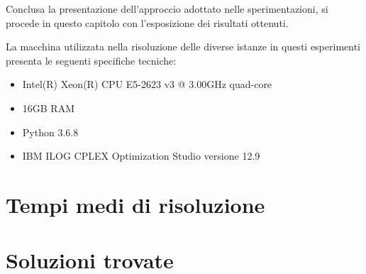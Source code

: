 Conclusa la presentazione dell'approccio adottato nelle sperimentazioni, si procede in questo capitolo con l'esposizione dei risultati ottenuti. 

La macchina utilizzata nella risoluzione delle diverse istanze in questi esperimenti presenta le seguenti specifiche tecniche:
\begin{itemize}
\item Intel(R) Xeon(R) CPU E5-2623 v3 @ 3.00GHz quad-core
\item 16GB RAM
\item Python 3.6.8
\item IBM ILOG CPLEX Optimization Studio versione 12.9
\end{itemize}


\newpage
\section{Tempi medi di risoluzione}



\section{Soluzioni trovate}